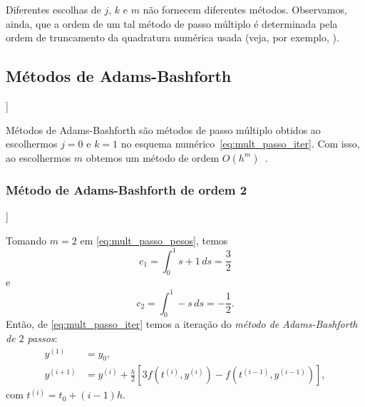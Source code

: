 Diferentes escolhas de $j$, $k$ e $m$ não fornecem diferentes métodos. Observamos, ainda, que a ordem de um tal método de passo múltiplo é determinada pela ordem de truncamento da quadratura numérica usada (veja, por exemplo, \cite[Cap. 5, Seç. 5.6]{Burden2015a}).

\subsection{Métodos de Adams-Bashforth}

\begin{flushleft}
  [[tag:revisar]]
\end{flushleft}

Métodos de Adams-Bashforth são métodos de passo múltiplo obtidos ao escolhermos $j=0$ e $k=1$ no esquema numérico~\eqref{eq:mult_passo_iter}. Com isso, ao escolhermos $m$ obtemos um método de ordem $O(h^{m})$~\cite[Cap. 5, Seç. 5.6]{Burden2015a}.

\subsubsection{Método de Adams-Bashforth de ordem 2}

\begin{flushleft}
  [[tag:revisar]]
\end{flushleft}

Tomando $m=2$ em \eqref{eq:mult_passo_pesos}, temos
\begin{equation}
  c_1 = \int_0^1 s+1\,ds = \frac{3}{2}
\end{equation}
e
\begin{equation}
  c_2 = \int_0^1 -s\,ds = -\frac{1}{2}.
\end{equation}
Então, de \eqref{eq:mult_passo_iter} temos a iteração do \emph{método de Adams-Bashforth de $2$ passos}:
\begin{align}
  y^{(1)} &= y_0,\\
  y^{(i+1)} &= y^{(i)} + \frac{h}{2}\left[3f(t^{(i)},y^{(i)}) - f(t^{(i-1)},y^{(i-1)})\right],
\end{align}
com $t^{(i)} = t_0 + (i-1)h$.

